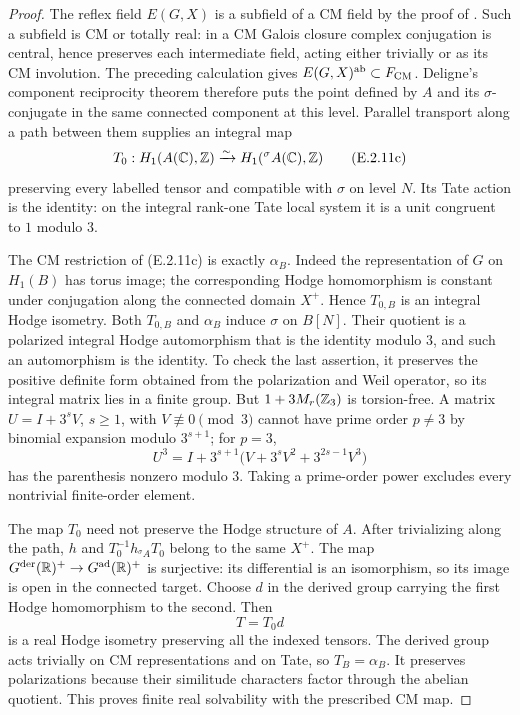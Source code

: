 \begin{proof}
The reflex field $E(G,X)$ is a subfield of a CM field by the proof
of \cite[Theorem~3.33, p.~46]{GenMilneShimura1994}. Such a subfield
is CM or totally real: in a CM Galois closure complex conjugation is
central, hence preserves each intermediate field, acting either
trivially or as its CM involution. The preceding calculation gives
$E(G,X)^{\rm ab}\subset F_{\rm CM}$.
Deligne's component reciprocity theorem
\cite[Section~2.6.1 and Theorem~2.6.3, p.~46 of the translation]{GenDeligneShimura1979}
therefore puts the point defined by $A$ and its $\sigma$-conjugate
in the same connected component at this level.
Parallel transport along a path between them supplies an integral
map
\[
 T_0:H_1(A(\mathbb C),\mathbb Z)\xrightarrow{\sim}
                     H_1({}^\sigma A(\mathbb C),\mathbb Z)
 \tag{E.2.11c}
\]
preserving every labelled tensor and compatible with $\sigma$ on
level $N$. Its Tate action is the identity: on the integral rank-one
Tate local system it is a unit congruent to $1$ modulo $3$.

The CM restriction of (E.2.11c) is exactly $\alpha_B$.
Indeed the representation of $G$ on $H_1(B)$ has torus image;
the corresponding Hodge homomorphism is constant under conjugation
along the connected domain $X^+$. Hence $T_{0,B}$ is an integral
Hodge isometry. Both $T_{0,B}$ and $\alpha_B$ induce $\sigma$ on
$B[N]$. Their quotient is a polarized integral Hodge automorphism
that is the identity modulo $3$, and such an automorphism is the
identity. To check the last assertion, it preserves the positive
definite form obtained from the polarization and Weil operator,
so its integral matrix lies in a finite group. But
$1+3M_r(\mathbb Z_3)$ is torsion-free. A matrix $U=I+3^sV$, $s\ge1$,
with $V\not\equiv0\pmod3$ cannot have prime order $p\ne3$ by
binomial expansion modulo $3^{s+1}$; for $p=3$,
\[
 U^3=I+3^{s+1}\bigl(V+3^sV^2+3^{2s-1}V^3\bigr)
\]
has the parenthesis nonzero modulo $3$. Taking a prime-order power
excludes every nontrivial finite-order element.

The map $T_0$ need not preserve the Hodge structure of $A$.
After trivializing along the path, $h$ and
$T_0^{-1}h_{{}^\sigma A}T_0$ belong to the same $X^+$.
The map
$G^{\rm der}(\mathbb R)^+\to G^{\rm ad}(\mathbb R)^+$
is surjective: its differential is an isomorphism, so its image is
open in the connected target. Choose $d$ in the derived group
carrying the first Hodge homomorphism to the second. Then
\[
 T=T_0d
 \tag{E.2.11d}
\]
is a real Hodge isometry preserving all the indexed tensors.
The derived group acts trivially on CM representations and on
Tate, so $T_B=\alpha_B$. It preserves polarizations because their
similitude characters factor through the abelian quotient.
This proves finite real solvability with the prescribed CM map.


\end{proof}
